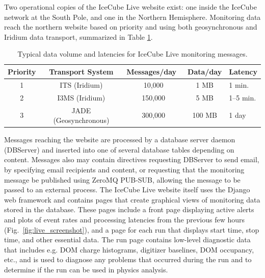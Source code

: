 Two operational copies of the IceCube Live website exist: one inside the
IceCube network at the South Pole, and one in the Northern Hemisphere.
Monitoring data reach the northern website based on priority and using
both geosynchronous and Iridium data transport, summarized in Table
\ref{i3messages}.

\begin{table}[!ht]
  \centering
  \caption{Typical data volume and latencies for IceCube Live monitoring
    messages.} 
  \label{i3messages}  
  \begin{tabularx}{0.85\textwidth}{|c|c|c|c|X|}
    \hline Priority & Transport System & Messages/day~ & Data/day & Latency\\
    \hline 1 & ITS (Iridium) & 10,000 & 1 MB & 1 min. \\
    \hline 2 & I3MS (Iridium) & 150,000 & 5 MB & 1--5 min. \\
    \hline 3 & JADE (Geosynchronous) & 300,000 & 100 MB & 1 day \\
    \hline
  \end{tabularx}
\end{table}

Messages reaching the website are processed by a database server daemon
(DBServer) and inserted into one of several database tables depending on content.
Messages also may contain directives requesting DBServer to send email, by
specifying email recipients and content, or requesting that the monitoring
message be published using ZeroMQ PUB-SUB, allowing the message to be
passed to an external process.  The IceCube Live website itself uses the
Django web framework and contains pages that create graphical views of
monitoring data stored in the database.  These pages include a front page
displaying active alerts and plots of event rates and processing latencies
from the previous few hours (Fig.~\ref{fig:live_screenshot}), and a page
for each run that displays start  
time, stop time, and other essential data.  The run page contains low-level
diagnostic data that includes e.g. DOM charge histograms, digitizer baselines,
DOM occupancy, etc., and is used to diagnose any problems that occurred
during the run and to determine if the run can be used in physics analysis.


